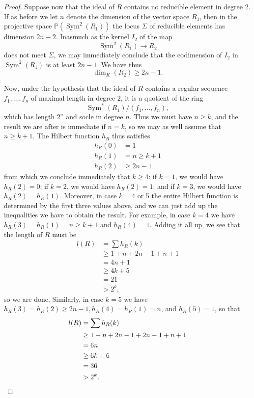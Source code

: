 \documentclass{bull-l}
\newcommand{\Sym}{\operatorname{Sym}}
\theoremstyle{pplain}
\theoremstyle{definition}
\begin{document}
\begin{proof}
Suppose now that the ideal of $R$ contains no reducible element in degree 2. 
If as before we let $n$ denote the dimension of the vector space $R_1$, then in
the projective space $\mathbb{P}(\Sym^2(R_1))$ the locus $\Sigma$ of reducible 
elements has dimension $2n-2$.  Inasmuch as the kernel $I_2$ of the map
\[\Sym^2(R_1)\to R_2\]
does not meet  $\Sigma$, we may immediately conclude that the codimension of
$I_2$ in $\Sym^2(R_1)$ is at least $2n-1$.  We have thus
\[\dim_K(R_2)\ge 2n-1.\]

Now, under the hypothesis that the ideal of $R$ contains a regular sequence
$f_1,\dots,f_n$ of maximal length in degree $2$, it is a quotient of the ring
\[\Sym^*(R_1)/ (f_1,\dots,f_n),\]
 which has length $2^n$ and socle in degree $n$. 
Thus we must have $n\ge k$, and the result we are after is immediate if $n=k$,
so we may as well assume that $n\ge k+1$.  The Hilbert function $h_R$ thus
satisfies
\begin{align*}
h_R(0)&=1\\
h_R(1)&=n\ge k+1\\
h_R(2)&\ge 2n-1
\end{align*}
from which we conclude immediately that $k\ge 4$: if $k=1$, we would have
$h_R(2)=0$; if $k=2$, we would have $h_R(2)=1$; and if $k=3$, we would have
$h_R(2)=h_R(1)$.  Moreover, in case $k=4$ or 5 the entire Hilbert function is
determined by the first three values above, and we can just add up the 
inequalities we have to obtain the result.  For example, in case $k=4$ we have
$h_R(3)=h_R(1)=n\ge k+1$ and $h_R(4)=1$.  Adding it all up, we see that the
length of $R$ must be
\begin{equation*} 
\begin{split}
l(R)&=\sum h_R(k)\\
&\ge1+n+2n-1+n+1\\
&=4n+1\\
&\ge 4k+5\\
&=21\\
&>2^k,
\end{split}
\end{equation*}
so we are done.  Similarly, in case $k=5$ we have $h_R(3)=h_R(2)\ge 2n-1,
h_R(4)=h_R(1)=n$, and $h_R(5)=1$, so that
\begin{equation*} 
\begin{split}
l(R)&=\sum h_R(k)\\
&\ge 1+n+2n-1+2n-1+n+1\\
&=6n\\
&\ge 6k+6\\
&=36\\
&>2^k. \qquad  \qed
\end{split}
\end{equation*}
\renewcommand{\qed}{}
\end{proof}
\end{document}
